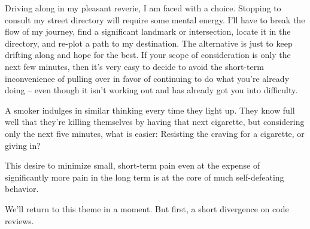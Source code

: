 \documentclass{article}
\begin{document}
Driving along in my pleasant reverie, I am faced with a choice. Stopping
to consult my street directory will require some mental energy. I'll
have to break the flow of my journey, find a significant landmark or
intersection, locate it in the directory, and re-plot a path to my
destination. The alternative is just to keep drifting along and hope for
the best. If your scope of consideration is only the next few minutes,
then it's very easy to decide to avoid the short-term inconvenience of
pulling over in favor of continuing to do what you're already doing --
even though it isn't working out and has already got you into
difficulty.

A smoker indulges in similar thinking every time they light up. They
know full well that they're killing themselves by having that next
cigarette, but considering only the next five minutes, what is easier:
Resisting the craving for a cigarette, or giving in?

This desire to minimize small, short-term pain even at the expense of
significantly more pain in the long term is at the core of much
self-defeating behavior.

We'll return to this theme in a moment. But first, a short divergence on
code reviews.
\end{document}
